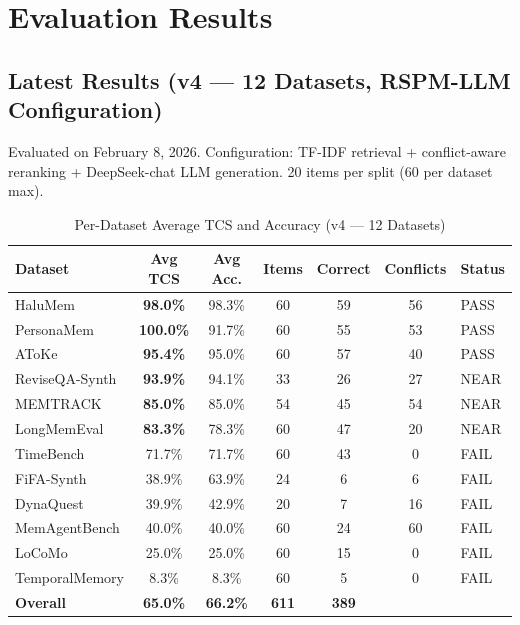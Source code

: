 \documentclass[11pt,a4paper]{article}
\begin{document}
\section{Evaluation Results}

\subsection{Latest Results (v4 --- 12 Datasets, RSPM-LLM Configuration)}

Evaluated on February 8, 2026. Configuration: TF-IDF retrieval + conflict-aware reranking + DeepSeek-chat LLM generation. 20 items per split (60 per dataset max).

\begin{table}[H]
\centering
\caption{Per-Dataset Average TCS and Accuracy (v4 --- 12 Datasets)}
\small
\begin{tabular}{@{}lcccccl@{}}
\toprule
\textbf{Dataset} & \textbf{Avg TCS} & \textbf{Avg Acc.} & \textbf{Items} & \textbf{Correct} & \textbf{Conflicts} & \textbf{Status} \\
\midrule
HaluMem         & \textbf{98.0\%} & 98.3\% & 60 & 59 & 56 & \textcolor{green!60!black}{PASS} \\
PersonaMem      & \textbf{100.0\%} & 91.7\% & 60 & 55 & 53 & \textcolor{green!60!black}{PASS} \\
AToKe           & \textbf{95.4\%} & 95.0\% & 60 & 57 & 40 & \textcolor{green!60!black}{PASS} \\
ReviseQA-Synth  & \textbf{93.9\%} & 94.1\% & 33 & 26 & 27 & \textcolor{orange!80!black}{NEAR} \\
MEMTRACK        & \textbf{85.0\%} & 85.0\% & 54 & 45 & 54 & \textcolor{orange!80!black}{NEAR} \\
LongMemEval     & \textbf{83.3\%} & 78.3\% & 60 & 47 & 20 & \textcolor{orange!80!black}{NEAR} \\
TimeBench       & 71.7\% & 71.7\% & 60 & 43 & 0 & \textcolor{red!70!black}{FAIL} \\
FiFA-Synth      & 38.9\% & 63.9\% & 24 & 6 & 6 & \textcolor{red!70!black}{FAIL} \\
DynaQuest       & 39.9\% & 42.9\% & 20 & 7 & 16 & \textcolor{red!70!black}{FAIL} \\
MemAgentBench   & 40.0\% & 40.0\% & 60 & 24 & 60 & \textcolor{red!70!black}{FAIL} \\
LoCoMo          & 25.0\% & 25.0\% & 60 & 15 & 0 & \textcolor{red!70!black}{FAIL} \\
TemporalMemory  & 8.3\% & 8.3\% & 60 & 5 & 0 & \textcolor{red!70!black}{FAIL} \\
\midrule
\textbf{Overall} & \textbf{65.0\%} & \textbf{66.2\%} & \textbf{611} & \textbf{389} & & \\
\bottomrule
\end{tabular}
\end{table}
\end{document}
